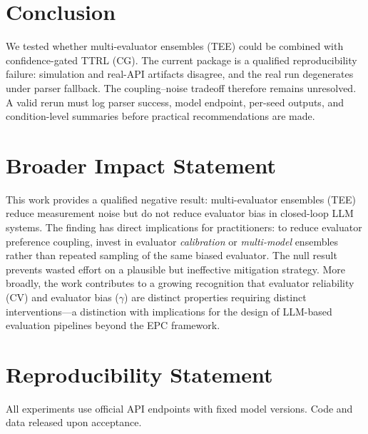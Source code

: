 \documentclass[11pt]{article}
\begin{document}
\section{Conclusion}

We tested whether multi-evaluator ensembles (TEE) could be combined with confidence-gated TTRL (CG). The current package is a qualified reproducibility failure: simulation and real-API artifacts disagree, and the real run degenerates under parser fallback. The coupling--noise tradeoff therefore remains unresolved. A valid rerun must log parser success, model endpoint, per-seed outputs, and condition-level summaries before practical recommendations are made.

\section*{Broader Impact Statement}

This work provides a qualified negative result: multi-evaluator ensembles (TEE) reduce measurement noise but do not reduce evaluator bias in closed-loop LLM systems. The finding has direct implications for practitioners: to reduce evaluator preference coupling, invest in evaluator \textit{calibration} or \textit{multi-model} ensembles rather than repeated sampling of the same biased evaluator. The null result prevents wasted effort on a plausible but ineffective mitigation strategy. More broadly, the work contributes to a growing recognition that evaluator reliability (CV) and evaluator bias ($\gamma$) are distinct properties requiring distinct interventions---a distinction with implications for the design of LLM-based evaluation pipelines beyond the EPC framework.

\section*{Reproducibility Statement}
All experiments use official API endpoints with fixed model versions. Code and data released upon acceptance.
\end{document}
